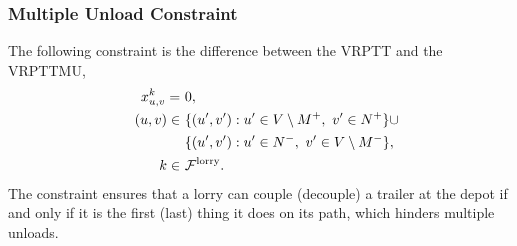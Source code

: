 



\subsubsection{Multiple Unload Constraint}
The following constraint is the difference between the VRPTT and the VRPTTMU,
\begin{align}
  \label{con:extra}
  x^{k}_{u,v} = \ &  0, \\
  \quad (u,v) \in \  & \{  (u',v') : u' \in V \setminus  M^+  , \ v' \in N^+  \} \cup \notag \\
   & \{  (u',v') : u' \in N^- , \ v'  \in V \setminus   M^-   \} ,\notag \\
  \ k \in \ & \mathcal{F}^{\rm lorry} . \notag
\end{align}
The constraint ensures that a lorry can couple (decouple) a trailer at the depot if and only if it is the first (last) thing it does on its path, which hinders multiple unloads. \\

